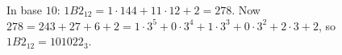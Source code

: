 In base $10$: $1B2_{12}=1\cdot144+11\cdot12+2=278$. Now $278=243+27+6+2=1\cdot3^5+0\cdot3^4+1\cdot3^3+0\cdot3^2+2\cdot3+2$, so $1B2_{12}=\boxed{101022_3}$.
